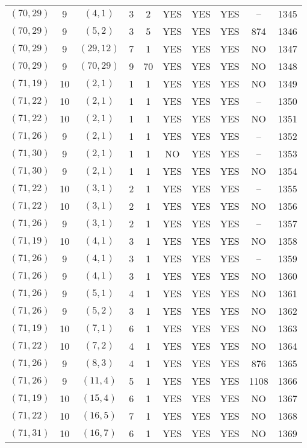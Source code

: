 \begin{longtable}{|c|c|c|c|c|c|c|c|c|c|}
$(70, 29)$ & 9 & $(4, 1)$ & 3 & 2 & YES & YES & YES & -- & 1345\\
$(70, 29)$ & 9 & $(5, 2)$ & 3 & 5 & YES & YES & YES & 874 & 1346\\
$(70, 29)$ & 9 & $(29, 12)$ & 7 & 1 & YES & YES & YES & NO & 1347\\
$(70, 29)$ & 9 & $(70, 29)$ & 9 & 70 & YES & YES & YES & NO & 1348\\
$(71, 19)$ & 10 & $(2, 1)$ & 1 & 1 & YES & YES & YES & NO & 1349\\
$(71, 22)$ & 10 & $(2, 1)$ & 1 & 1 & YES & YES & YES & -- & 1350\\
$(71, 22)$ & 10 & $(2, 1)$ & 1 & 1 & YES & YES & YES & NO & 1351\\
$(71, 26)$ & 9 & $(2, 1)$ & 1 & 1 & YES & YES & YES & -- & 1352\\
$(71, 30)$ & 9 & $(2, 1)$ & 1 & 1 & NO & YES & YES & -- & 1353\\
$(71, 30)$ & 9 & $(2, 1)$ & 1 & 1 & YES & YES & YES & NO & 1354\\
$(71, 22)$ & 10 & $(3, 1)$ & 2 & 1 & YES & YES & YES & -- & 1355\\
$(71, 22)$ & 10 & $(3, 1)$ & 2 & 1 & YES & YES & YES & NO & 1356\\
$(71, 26)$ & 9 & $(3, 1)$ & 2 & 1 & YES & YES & YES & -- & 1357\\
$(71, 19)$ & 10 & $(4, 1)$ & 3 & 1 & YES & YES & YES & NO & 1358\\
$(71, 26)$ & 9 & $(4, 1)$ & 3 & 1 & YES & YES & YES & -- & 1359\\
$(71, 26)$ & 9 & $(4, 1)$ & 3 & 1 & YES & YES & YES & NO & 1360\\
$(71, 26)$ & 9 & $(5, 1)$ & 4 & 1 & YES & YES & YES & NO & 1361\\
$(71, 26)$ & 9 & $(5, 2)$ & 3 & 1 & YES & YES & YES & NO & 1362\\
$(71, 19)$ & 10 & $(7, 1)$ & 6 & 1 & YES & YES & YES & NO & 1363\\
$(71, 22)$ & 10 & $(7, 2)$ & 4 & 1 & YES & YES & YES & NO & 1364\\
$(71, 26)$ & 9 & $(8, 3)$ & 4 & 1 & YES & YES & YES & 876 & 1365\\
$(71, 26)$ & 9 & $(11, 4)$ & 5 & 1 & YES & YES & YES & 1108 & 1366\\
$(71, 19)$ & 10 & $(15, 4)$ & 6 & 1 & YES & YES & YES & NO & 1367\\
$(71, 22)$ & 10 & $(16, 5)$ & 7 & 1 & YES & YES & YES & NO & 1368\\
$(71, 31)$ & 10 & $(16, 7)$ & 6 & 1 & YES & YES & YES & NO & 1369\\

\end{longtable}
